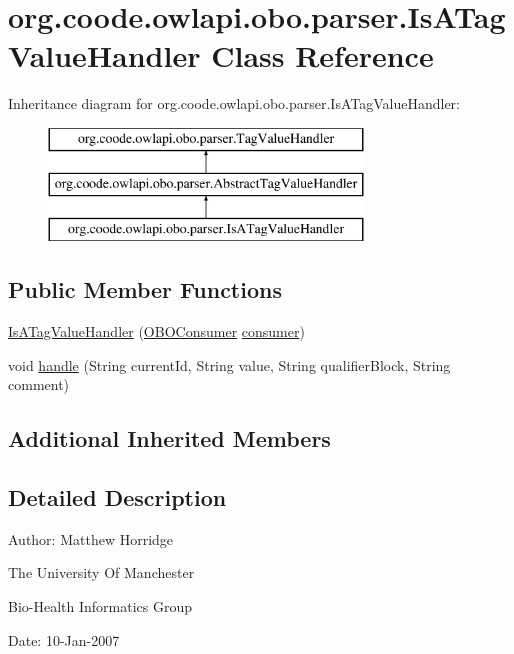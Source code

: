 \hypertarget{classorg_1_1coode_1_1owlapi_1_1obo_1_1parser_1_1_is_a_tag_value_handler}{\section{org.\-coode.\-owlapi.\-obo.\-parser.\-Is\-A\-Tag\-Value\-Handler Class Reference}
\label{classorg_1_1coode_1_1owlapi_1_1obo_1_1parser_1_1_is_a_tag_value_handler}
}
Inheritance diagram for org.\-coode.\-owlapi.\-obo.\-parser.\-Is\-A\-Tag\-Value\-Handler\-:\begin{figure}[H]
\begin{center}
\leavevmode
\includegraphics[height=3.000000cm]{classorg_1_1coode_1_1owlapi_1_1obo_1_1parser_1_1_is_a_tag_value_handler}
\end{center}
\end{figure}
\subsection*{Public Member Functions}
\begin{DoxyCompactItemize}
\item 
\hyperlink{classorg_1_1coode_1_1owlapi_1_1obo_1_1parser_1_1_is_a_tag_value_handler_a421e8e0f21b3f190df3b3f5707170192}{Is\-A\-Tag\-Value\-Handler} (\hyperlink{classorg_1_1coode_1_1owlapi_1_1obo_1_1parser_1_1_o_b_o_consumer}{O\-B\-O\-Consumer} \hyperlink{classorg_1_1coode_1_1owlapi_1_1obo_1_1parser_1_1_abstract_tag_value_handler_ab27f1ff22d15640c5f81585f18265137}{consumer})
\item 
void \hyperlink{classorg_1_1coode_1_1owlapi_1_1obo_1_1parser_1_1_is_a_tag_value_handler_a49b83e67e2ce13a4952af942a9227f10}{handle} (String current\-Id, String value, String qualifier\-Block, String comment)
\end{DoxyCompactItemize}
\subsection*{Additional Inherited Members}


\subsection{Detailed Description}
Author\-: Matthew Horridge\par
 The University Of Manchester\par
 Bio-\/\-Health Informatics Group\par
 Date\-: 10-\/\-Jan-\/2007\par
\par
 

